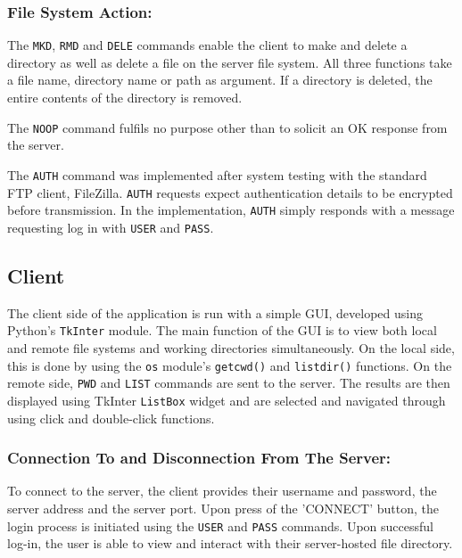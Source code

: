 \documentclass[10pt,twocolumn]{witseiepaper}
\begin{document}
\subsubsection*{File System Action: }
The \texttt{MKD}, \texttt{RMD} and \texttt{DELE} commands enable the client to make and delete a directory as well as delete a file on the server file system. All three functions take a file name, directory name or path as argument. If a directory is deleted, the entire contents of the directory is removed.

The \texttt{NOOP} command fulfils no purpose other than to solicit an OK response from the server.

The \texttt{AUTH} command was implemented after system testing with the standard FTP client, FileZilla. \texttt{AUTH} requests expect authentication details to be encrypted before transmission. In the implementation, \texttt{AUTH} simply responds with a message requesting log in with \texttt{USER} and \texttt{PASS}.

\subsection{Client}



The client side of the application is run with a simple GUI, developed using Python's \texttt{TkInter} module. The main function of the GUI is to view both local and remote file systems and working directories simultaneously. On the local side, this is done by using the \texttt{os} module's \texttt{getcwd()} and \texttt{listdir()} functions. On the remote side, \texttt{PWD} and \texttt{LIST} commands are sent to the server. The results are then displayed using TkInter \texttt{ListBox} widget and are selected and navigated through using click and double-click functions.

\vspace*{-2mm}
\subsubsection*{Connection To and Disconnection From The Server: }
To connect to the server, the client provides their username and password, the server address and the server port. Upon press of the 'CONNECT' button, the login process is initiated using the \texttt{USER} and \texttt{PASS} commands. Upon successful log-in, the user is able to view and interact with their server-hosted file directory.
 
\end{document}
